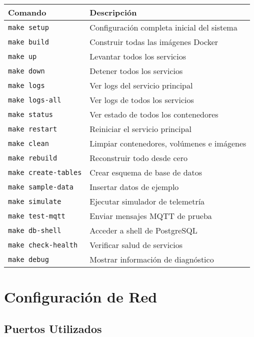 \begin{table}[H]
\centering
\small
\begin{tabular}{|l|p{8cm}|}
\hline
\textbf{Comando} & \textbf{Descripción} \\
\hline
\texttt{make setup} & Configuración completa inicial del sistema \\
\hline
\texttt{make build} & Construir todas las imágenes Docker \\
\hline
\texttt{make up} & Levantar todos los servicios \\
\hline
\texttt{make down} & Detener todos los servicios \\
\hline
\texttt{make logs} & Ver logs del servicio principal \\
\hline
\texttt{make logs-all} & Ver logs de todos los servicios \\
\hline
\texttt{make status} & Ver estado de todos los contenedores \\
\hline
\texttt{make restart} & Reiniciar el servicio principal \\
\hline
\texttt{make clean} & Limpiar contenedores, volúmenes e imágenes \\
\hline
\texttt{make rebuild} & Reconstruir todo desde cero \\
\hline
\texttt{make create-tables} & Crear esquema de base de datos \\
\hline
\texttt{make sample-data} & Insertar datos de ejemplo \\
\hline
\texttt{make simulate} & Ejecutar simulador de telemetría \\
\hline
\texttt{make test-mqtt} & Enviar mensajes MQTT de prueba \\
\hline
\texttt{make db-shell} & Acceder a shell de PostgreSQL \\
\hline
\texttt{make check-health} & Verificar salud de servicios \\
\hline
\texttt{make debug} & Mostrar información de diagnóstico \\
\hline
\end{tabular}
\end{table}

\section{Configuración de Red}

\subsection{Puertos Utilizados}

